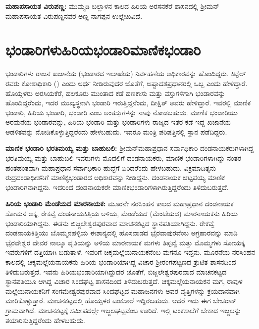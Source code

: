 \textbf{ಮಹಾಪಸಾಯತ ವಿರುಪಣ್ಣ:} ಮುಮ್ಮಡಿ ಬಲ್ಲಾಳನ ಕಾಲದ ಹಿರಿಯ ಅರಸನಕೆರೆ ಶಾಸನದಲ್ಲಿ ಶ‍್ರೀಮನ್​ ಮಹಾಪಸಾಯತ ವಿರುಪಣ್ಣನವರ ಅಣ್ಣ ನಾಗಪ್ಪನ ಉಲ್ಲೇಖವಿದೆ.


\section*{ಭಂಡಾರಿಗಳು\enginline{-}ಹಿರಿಯಭಂಡಾರಿ\enginline{-}ಮಾಣಿಕಭಂಡಾರಿ}

ಭಂಡಾರಿಗಳು ರಾಜನ ಖಜಾನೆಯ (ಭಂಡಾರದ ಇಲಾಖೆಯ) ನಿರ್ವಹಣೆಯ ಅಧಿಕಾರವನ್ನು ಹೊಂದಿದ್ದರು. ಕಿಟ್ಟೆಲ್​ರವರು ಕೋಶಾಧಿಕಾರಿ () ಎಂದು ಅರ್ಥ ನೀಡಿರುವುದರ ಜೊತೆಗೆ, ಅಷ್ಟಾದಶಪ್ರಧಾನರಲ್ಲಿ ಒಬ್ಬ ಎಂದು ಹೇಳಿದ್ದಾರೆ. ಹೊಯ್ಸಳರು ಅರಸಿಯಕೆರೆ, ಹಲಕೂರು ಮುಂತಾದ ಕಡೆ ಹಣಕಾಸು ಮತ್ತು ವಸ್ತುಗಳಿಗಾಗಿ ಭಂಡಾರವನ್ನು ಹೊಂದಿದ್ದರೆಂದು, ಇದರ ಮುಖ್ಯಸ್ಥನಾಗಿ ಭಂಡಾರಿ ಇರುತ್ತಿದ್ದನೆಂದು, ದೀಕ್ಷಿತ್​ ಅವರು ಹೇಳಿದ್ದಾರೆ. ಇವರಲ್ಲಿ ಮಾಣಿಕ ಭಂಡಾರಿ, ಹಿರಿಯ ಭಂಡಾರಿ, ಭಂಡಾರಿ ಎಂಬ ಅಂತಸ್ತುಗಳನ್ನು ನಾವು ನೋಡಬಹುದು. ಮಾಣಿಕ ಭಂಡಾರಿಯು ಅರಮನೆಯ ಭಂಡಾರವನ್ನು, ಹಿರಿಯ ಭಂಡಾರಿ ಮತ್ತು ಭಂಡಾರಿಗಳು ರಾಜ್ಯದ ಇತರ ಕಡೆ ಇದ್ದ ಖಜಾನೆಯ ಆಡಳಿತವನ್ನು ನೋಡಿಕೊಳ್ಳುತ್ತಿದ್ದರೆಂದು ಹೇಳಬಹುದು. ಇವರೂ ಮಂತ್ರಿ ಪರಿಷತ್ತಿನಲ್ಲಿ ಸ್ಥಾನ ಪಡೆದಿದ್ದರು.

\textbf{ಮಾಣಿಕ ಭಂಡಾರಿ ಭರತಿಮಯ್ಯ ಮತ್ತು ಬಾಹುಬಲಿ:} ಶ‍್ರೀಮನ್​ಮಹಾಪ್ರಧಾನ ಸರ್ವಾಧಿಕಾರಿ ದಂಡನಾಯಕರು\-ಗಳಾಗಿದ್ದ ಭರತಿಮಯ್ಯ ಮತ್ತು ಬಾಹುಬಲಿ ಇವರುಗಳು ಮೊದಲಿಗೆ ದಂಡನಾಯಕರು, ಮಾಣಿಕ ಭಂಡಾರಿಗಳಾಗಿದ್ದು ನಂತರ ಹಂತಹಂತವಾಗಿ ಮಹಾಪ್ರಧಾನ ಸರ್ವಾಧಿಕಾರಿ ಹುದ್ದೆಗೆ ಏರಿದರೆಂದು ಹೇಳಬಹುದು. ವಿಕ್ರಮಾದಿತ್ಯನು ರುದ್ರದಂಡಾಧೀಶ\-ನಿಗೆ ಮಾಣಿಕ್ಯಭಂಡಾರದ ಅಧಿಕಾರವನ್ನು ನೀಡಿದ್ದನು. ದಂಡನಾಯಕ ಚಟ್ಟಪಯ್ಯ ಮಾಣಿಕ ಭಂಡಾರಿಗನಾಗಿದ್ದನು. ಇದರಿಂದ ದಂಡನಾಯಕರೇ ಮಾಣಿಕಭಂಡಾರಿಗಳಾಗಿರುತ್ತಿದ್ದರೆಂದು ತಿಳಿದುಬರುತ್ತದೆ.

\textbf{ಹಿರಿಯ ಭಂಡಾರಿ ಮೆಂಡೆಯದ ಮಾರನಾಯಕ:} ಮೂರನೇ ನರಸಿಂಹನ ಕಾಲದ ಮಹಾಪ್ರಧಾನ ದಂಡನಾಯಕ ಸೋಮನ ಅಕ್ಕ, ರೇಕವ್ವೆ ದಂಡನಾಯಕಿತ್ತಿಯ ಅಳಿಯ, ಮೆಂಡೆಯದ (ಮೆಂಟೆಯದ) ಮಾರನಾಯಕನು ಹಿರಿಯ ಭಂಡಾರಿ\-ಯಾಗಿದ್ದನು. ಈತನು ಬಿಜ್ಜಲೇಶ್ವರಪುರವಾದ ಮಾಚನಕಟ್ಟದ ಸ್ಥಾನಪತಿಯಾಗಿದ್ದನು. ರೇಕವ್ವೆ ದಂಡನಾಯಕಿತ್ತಿಯು ಬೊಮ್ಮನಹಳ್ಳಿಯ ಈಶಾನ್ಯದಲ್ಲಿ ಹೊಸವಾಡದ ಭೈರವಾಪುರವೆಂಬ ಅಗ್ರಹಾರವನ್ನು ಮಾಡಿ ಭೈರವೇಶ್ವರ ದೇವರ ನಾಲ್ಕೂ ವೃತಿಯನ್ನು ಅಳಿಯ ಮಾರನಾಯಕ ಮಗಳು ತಿಪ್ಪವ್ವೆ ಮತ್ತು ಮೊಮ್ಮಗಳು ಸೋಯಕ್ಕ ಇವರುಗಳಿಗೆ ದತ್ತಿಯಾಗಿ ಬಿಡುತ್ತಾಳೆ. ಇವರಿಗೆ ಚಿಕ್ಕಮಲ್ಲೆಯನಾಯಕನೆಂಬ ಮಗನೂ ಇದ್ದನು. ಮೂರನೆಯ ನರಸಿಂಹನ ಕಾಲದಲ್ಲಿ ಚಿಕ್ಕಮಲ್ಲೆಯನಾಯಕನು ಹಿರಿಯ ಭಂಡಾರಿಯಾಗಿದ್ದ ವಿಚಾರ ಶ‍್ರೀರಂಗಪಟ್ಟಣದ ತ್ರುಟಿತ ಶಾಸನದಿಂದ ತಿಳಿದುಬರುತ್ತದೆ. ಇವನು ಹಿರಿಯಭಂಡಾರಿಯಾಗಿ\-ದ್ದುದರ ಜೊತೆಗೆ, ಬಿಜ್ಜಲೇಶ್ವರಪುರವಾದ ಮಾಚನಕಟ್ಟದ ಸ್ಥಾನಪತಿಯೂ ಆಗಿದ್ದ ವಿಚಾರ ಸಿಂದಘಟ್ಟ ಶಾಸನದಿಂದ ತಿಳಿದು\-ಬರುತ್ತದೆ. ಚಿಕ್ಕಮಲ್ಲೆಯನಾಯಕನ ಮಗ, ರಾವುಳ ಮಲ್ಲೆಯನಾಯಕನಿಗೆ ಸಂಗಮೇಶ್ವರಪುರವಾದ ಸಿಂದಘಟ್ಟದ ಮಹಾಜನಗಳು ಅವರ ವೃತ್ತಿಗಳನ್ನು ಕ್ರಯದಾನವಾಗಿ ಮಾರಿಕೊಳ್ಳುತ್ತಾರೆ. ಮಾಚನಕಟ್ಟದಲ್ಲಿ ಹೊಯ್ಸಳರ ಟಂಕಸಾಲೆ ಇದ್ದಿರಬಹುದು. ಆದರೆ ಇದು ಈಗ ಬೇಚರಾಕ್​ ಗ್ರಾಮವಾಗಿದೆ. ಮಾಚನಕಟ್ಟಕ್ಕೆ ಸಮೀಪದಲ್ಲೇ ಇಜ್ಜಲಘಟ್ಟವೆಂಬ ಊರಿದೆ. ಇಲ್ಲಿ ಟಂಕಸಾಲೆಗೆ ಬೇಕಾದ ಇಜ್ಜಲನ್ನು ತಯಾರಿಸುತ್ತಿದ್ದರೆಂದು ಹೇಳಬಹುದು.

